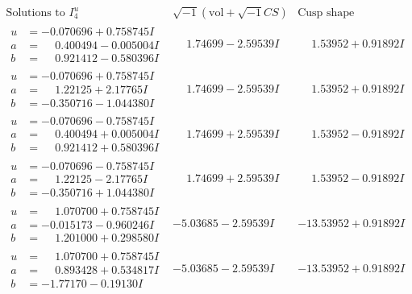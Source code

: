 \documentclass[1p]{elsarticle_modified}
\theoremstyle{definition}
\newcommand{\I}{\sqrt{-1}}
\begin{document}
$$\begin{array}{c|c|c}  
\text{Solutions to }I^u_{4}& \I (\text{vol} + \sqrt{-1}CS) & \text{Cusp shape}\\
 \hline 
\begin{aligned}
u &= -0.070696 + 0.758745 I \\
a &= \phantom{-}0.400494 - 0.005004 I \\
b &= \phantom{-}0.921412 - 0.580396 I\end{aligned}
 & \phantom{-}1.74699 - 2.59539 I & \phantom{-}1.53952 + 0.91892 I \\ \hline\begin{aligned}
u &= -0.070696 + 0.758745 I \\
a &= \phantom{-}1.22125 + 2.17765 I \\
b &= -0.350716 - 1.044380 I\end{aligned}
 & \phantom{-}1.74699 - 2.59539 I & \phantom{-}1.53952 + 0.91892 I \\ \hline\begin{aligned}
u &= -0.070696 - 0.758745 I \\
a &= \phantom{-}0.400494 + 0.005004 I \\
b &= \phantom{-}0.921412 + 0.580396 I\end{aligned}
 & \phantom{-}1.74699 + 2.59539 I & \phantom{-}1.53952 - 0.91892 I \\ \hline\begin{aligned}
u &= -0.070696 - 0.758745 I \\
a &= \phantom{-}1.22125 - 2.17765 I \\
b &= -0.350716 + 1.044380 I\end{aligned}
 & \phantom{-}1.74699 + 2.59539 I & \phantom{-}1.53952 - 0.91892 I \\ \hline\begin{aligned}
u &= \phantom{-}1.070700 + 0.758745 I \\
a &= -0.015173 - 0.960246 I \\
b &= \phantom{-}1.201000 + 0.298580 I\end{aligned}
 & -5.03685 - 2.59539 I & -13.53952 + 0.91892 I \\ \hline\begin{aligned}
u &= \phantom{-}1.070700 + 0.758745 I \\
a &= \phantom{-}0.893428 + 0.534817 I \\
b &= -1.77170 - 0.19130 I\end{aligned}
 & -5.03685 - 2.59539 I & -13.53952 + 0.91892 I \\ \hline\begin{aligned}

\end{aligned}
\end{array}$$
\end{document}
